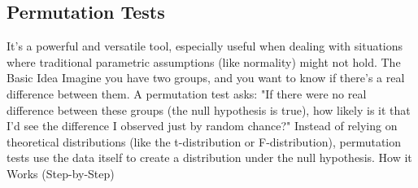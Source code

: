 \documentclass[11pt]{article}
\begin{document}
\subsection{Permutation Tests}
It's a powerful and versatile tool, especially useful when dealing with situations where traditional parametric assumptions (like normality) might not hold.
The Basic Idea
Imagine you have two groups, and you want to know if there's a real difference between them.  A permutation test asks: "If there were no real difference between these groups (the null hypothesis is true), how likely is it that I'd see the difference I observed just by random chance?"
Instead of relying on theoretical distributions (like the t-distribution or F-distribution), permutation tests use the data itself to create a distribution under the null hypothesis.
How it Works (Step-by-Step)
\begin{itemize}
    

\end{itemize}
\end{document}
